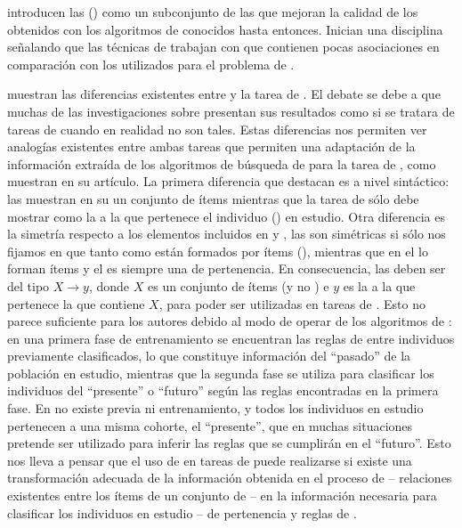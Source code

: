 \citet{LiuHsuMa-IntegratingClassificationAndARM-1998} introducen las \CARs (\sCAR) como un subconjunto de las \ARs que mejoran la calidad de los \Clasificadores obtenidos con los algoritmos de \Clasificacion conocidos hasta entonces. Inician una disciplina señalando que las técnicas de \ARM trabajan con \transacciones que contienen pocas asociaciones en comparación con los \datasets utilizados para el problema de \Clasificacion.

\citet{Freitas-UnderstandingDiffBetweenClassifAndDiscoveryOfAR-2000} muestran las diferencias existentes entre \ARM y la tarea de \clasificacion. El debate se debe a que muchas de las investigaciones sobre \ARM presentan sus resultados como si se tratara de tareas de \clasificacion cuando en realidad no son tales. Estas diferencias nos permiten ver analogías existentes entre ambas tareas que permiten una adaptación de la información extraída de los algoritmos de búsqueda de \ars para la tarea de \clasificacion, como muestran \citet{LiuHsuMa-IntegratingClassificationAndARM-1998} en su artículo. La primera diferencia que destacan es a nivel sintáctico: las \ars muestran en su \consecuente un conjunto de ítems mientras que la tarea de \clasificacion sólo debe mostrar como \consecuente la \clase a la que pertenece el individuo (\transaccion) en estudio. Otra diferencia es la simetría respecto a los elementos incluidos en \antecedente y \consecuente, las \ars son simétricas si sólo nos fijamos en que tanto \antecedente como \consecuente están formados por ítems (\atributos), mientras que en \clasificacion el \antecedente lo forman ítems y el \consecuente es siempre una \clase de pertenencia. En consecuencia, las \ars deben ser del tipo $X\rightarrow y$, donde $X$ es un conjunto de ítems (\atributos y no \clases) e $y$ es la \clase a la que pertenece la \transaccion que contiene $X$, para poder ser utilizadas en tareas de \clasificacion. Esto no parece suficiente para los autores debido al modo de operar de los algoritmos de \clasificacion: en una primera fase de entrenamiento se encuentran las reglas de \clasificacion entre individuos previamente clasificados, lo que constituye información del "`pasado"' de la población en estudio, mientras que la segunda fase se utiliza para clasificar los individuos del "`presente"' o "`futuro"' según las reglas encontradas en la primera fase. En \ARM no existe \clasificacion previa ni entrenamiento, y todos los individuos en estudio pertenecen a una misma cohorte, el "`presente"', que en muchas situaciones pretende ser utilizado para inferir las reglas que se cumplirán en el "`futuro"'. Esto nos lleva a pensar que el uso de \ars en tareas de \clasificacion puede realizarse si existe una transformación adecuada de la información obtenida en el proceso de \ARM -- relaciones existentes entre los ítems de un conjunto de \transacciones -- en la información necesaria para clasificar los individuos en estudio -- \clases de pertenencia y reglas de \clasificacion.


